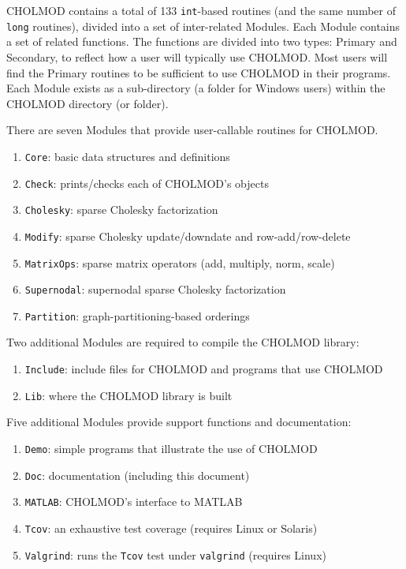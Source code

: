 \documentclass[11pt]{article}
\begin{document}
CHOLMOD contains a total of 133 {\tt int}-based routines (and the same number
of {\tt long} routines), divided into a set of inter-related
Modules.  Each Module contains a set of related functions.  The functions
are divided into two types: Primary and Secondary, to reflect how a user will
typically use CHOLMOD.  Most users will find the Primary routines to be
sufficient to use CHOLMOD in their programs.  Each Module exists as a
sub-directory (a folder for Windows users) within the CHOLMOD directory
(or folder).

\vspace{0.1in}
\noindent There are seven Modules that provide user-callable routines for CHOLMOD.
    \begin{enumerate}
    \item {\tt Core}: basic data structures and definitions
    \item {\tt Check}: prints/checks each of CHOLMOD's objects
    \item {\tt Cholesky}: sparse Cholesky factorization
    \item {\tt Modify}: sparse Cholesky update/downdate and row-add/row-delete
    \item {\tt MatrixOps}: sparse matrix operators (add, multiply, norm, scale)
    \item {\tt Supernodal}: supernodal sparse Cholesky factorization
    \item {\tt Partition}: graph-partitioning-based orderings
    \end{enumerate}

\noindent Two additional Modules are required to compile the CHOLMOD library:
    \begin{enumerate}
    \item {\tt Include}: include files for CHOLMOD and programs that use CHOLMOD
    \item {\tt Lib}: where the CHOLMOD library is built
    \end{enumerate}

\noindent Five additional Modules provide support functions and documentation:
    \begin{enumerate}
    \item {\tt Demo}: simple programs that illustrate the use of CHOLMOD
    \item {\tt Doc}: documentation (including this document)
    \item {\tt MATLAB}: CHOLMOD's interface to MATLAB
    \item {\tt Tcov}: an exhaustive test coverage (requires Linux or Solaris)
    \item {\tt Valgrind}: runs the {\tt Tcov} test under {\tt valgrind} (requires Linux)
    \end{enumerate}
\end{document}
